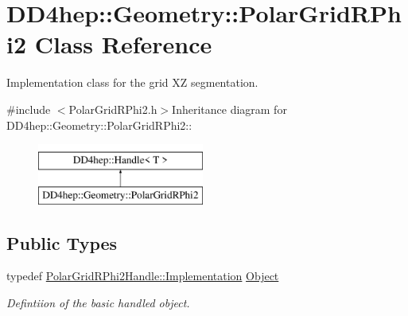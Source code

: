 \hypertarget{class_d_d4hep_1_1_geometry_1_1_polar_grid_r_phi2}{
\section{DD4hep::Geometry::PolarGridRPhi2 Class Reference}
\label{class_d_d4hep_1_1_geometry_1_1_polar_grid_r_phi2}
}


Implementation class for the grid XZ segmentation.  


{\ttfamily \#include $<$PolarGridRPhi2.h$>$}Inheritance diagram for DD4hep::Geometry::PolarGridRPhi2::\begin{figure}[H]
\begin{center}
\leavevmode
\includegraphics[height=2cm]{class_d_d4hep_1_1_geometry_1_1_polar_grid_r_phi2}
\end{center}
\end{figure}
\subsection*{Public Types}
\begin{DoxyCompactItemize}
\item 
typedef \hyperlink{class_t}{PolarGridRPhi2Handle::Implementation} \hyperlink{class_d_d4hep_1_1_geometry_1_1_polar_grid_r_phi2_a1067131b00d726a9739132de2eea6d86}{Object}
\begin{DoxyCompactList}\small\item\em Defintiion of the basic handled object. \item\end{DoxyCompactList}\end{DoxyCompactItemize}
